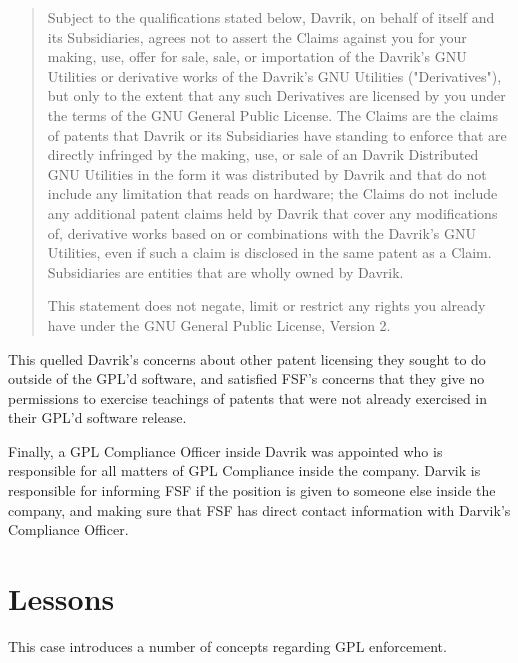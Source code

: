 \documentclass[12pt]{report}
\begin{document}
\begin{quotation}
Subject to the qualifications stated below, Davrik, on behalf of itself
and its Subsidiaries, agrees not to assert the Claims against you for your
making, use, offer for sale, sale, or importation of the Davrik's GNU
Utilities or derivative works of the Davrik's GNU Utilities
("Derivatives"), but only to the extent that any such Derivatives are
licensed by you under the terms of the GNU General Public License.  The
Claims are the claims of patents that Davrik or its Subsidiaries have
standing to enforce that are directly infringed by the making, use, or
sale of an Davrik Distributed GNU Utilities in the form it was distributed
by Davrik and that do not include any limitation that reads on hardware;
the Claims do not include any additional patent claims held by Davrik that
cover any modifications of, derivative works based on or combinations with
the Davrik's GNU Utilities, even if such a claim is disclosed in the same
patent as a Claim.  Subsidiaries are entities that are wholly owned by
Davrik.

This statement does not negate, limit or restrict any rights you already
have under the GNU General Public License, Version 2.
\end{quotation}

This quelled Davrik's concerns about other patent licensing they sought to
do outside of the GPL'd software, and satisfied FSF's concerns that they
give no permissions to exercise teachings of patents that were not already
exercised in their GPL'd software release.

Finally, a GPL Compliance Officer inside Davrik was appointed who is
responsible for all matters of GPL Compliance inside the company.  Darvik
is responsible for informing FSF if the position is given to someone else
inside the company, and making sure that FSF has direct contact
information with Darvik's Compliance Officer.

\section{Lessons}

This case introduces a number of concepts regarding GPL enforcement.
\end{document}
